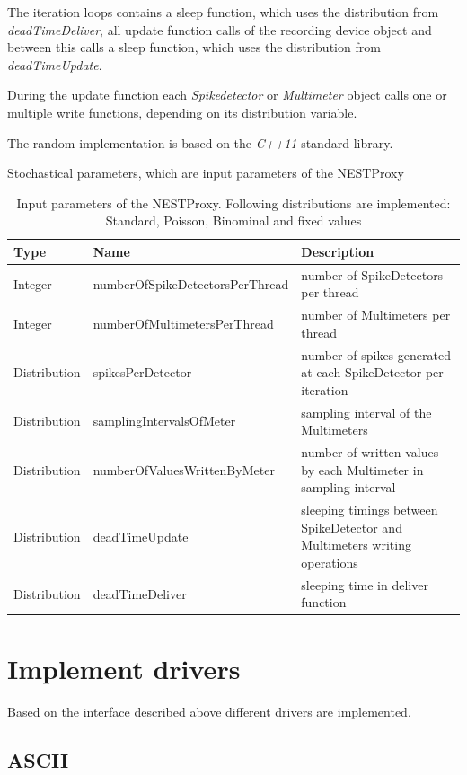 \documentclass[]{YIC2015}
\begin{document}
The iteration loops contains a sleep function, which uses the
distribution from \emph{deadTimeDeliver}, all update function calls of
the recording device object and between this calls a sleep function,
which uses the distribution from \emph{deadTimeUpdate}.

During the update function each \emph{Spikedetector} or
\emph{Multimeter} object calls one or multiple write functions,
depending on its distribution variable.

The random implementation is based on the \emph{C++11} standard library.
\begin{table}[htdp]
\caption{Stochastical parameters, which are input parameters of the NESTProxy}
\centering
\begin{tabular}{lll}
\hline\hline
\textbf{Type} & \textbf{Name}                   & \textbf{Description} \\ \hline
Integer       & numberOfSpikeDetectorsPerThread & number of SpikeDetectors per thread  \\
Integer       & numberOfMultimetersPerThread    & number of Multimeters per thread  \\
Distribution  & spikesPerDetector               & number of spikes generated at each SpikeDetector per iteration  \\
Distribution  & samplingIntervalsOfMeter        & sampling interval of the Multimeters  \\
Distribution  & numberOfValuesWrittenByMeter    & number of written values by each Multimeter in sampling interval  \\
Distribution  & deadTimeUpdate                  & sleeping timings between SpikeDetector and Multimeters writing operations \\
Distribution  & deadTimeDeliver                 & sleeping time in deliver function  \\
\hline\hline
\end{tabular}
\label{tab:table-silva1}
\caption{Input parameters of the NESTProxy. Following distributions
are implemented: Standard, Poisson, Binominal and fixed values}
\end{table}

\section{Implement drivers}
Based on the interface described above different drivers are
implemented.

\subsection{ASCII}
\end{document}

